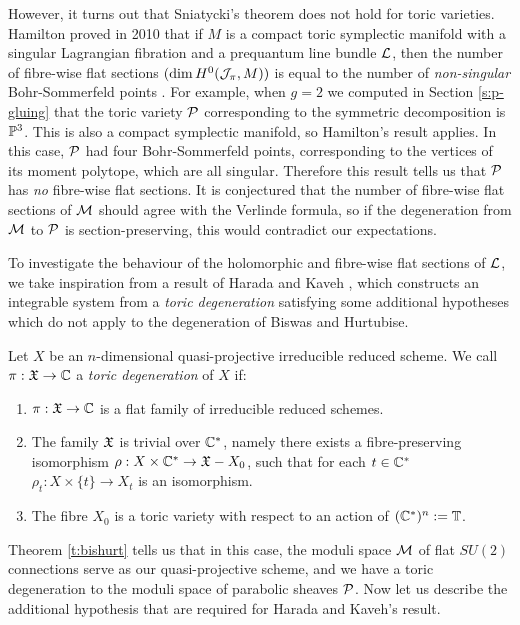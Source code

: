 	However, it turns out that Sniatycki's theorem does not hold for toric varieties. Hamilton proved in 2010 that if $M$ is a compact toric symplectic manifold with a singular Lagrangian fibration and a prequantum line bundle $\mathcal{L}$, then the number of fibre-wise flat sections $(\dim H^0(\mathcal{J}_{\pi}, M))$ is equal to the number of \emph{non-singular} Bohr-Sommerfeld points \cite[Theorem 8.3.2]{hamilton_locally_2010}. For example, when $g=2$ we computed in Section \ref{s:p-gluing} that the toric variety $\mathcal{P}$ corresponding to the symmetric decomposition is $\mathbb{P}^3$. This is also a compact symplectic manifold, so Hamilton's result applies. In this case, $\mathcal{P}$ had four Bohr-Sommerfeld points, corresponding to the vertices of its moment polytope, which are all singular. Therefore this result tells us that $\mathcal{P}$ has \emph{no} fibre-wise flat sections. It is conjectured that the number of fibre-wise flat sections of $\mathcal{M}$ should agree with the Verlinde formula, so if the degeneration from $\mathcal{M}$ to $\mathcal{P}$ is section-preserving, this would contradict our expectations.
	
	To investigate the behaviour of the holomorphic and fibre-wise flat sections of $\mathcal{L}$, we take inspiration from a result of Harada and Kaveh \cite{harada_integrable_2015}, which constructs an integrable system from a \textit{toric degeneration} satisfying some additional hypotheses which do not apply to the degeneration of Biswas and Hurtubise. 
	\begin{definition}
		\label{d:toricdegen}
		Let $X$ be an $n$-dimensional quasi-projective irreducible reduced scheme. We call $\pi: \mathfrak{X}\to\mathbb{C}$ a \emph{toric degeneration} of $X$ if:
		\begin{enumerate}
			\item $\pi:\mathfrak{X}\to\mathbb{C}$ is a flat family of irreducible reduced schemes.
			\item The family $\mathfrak{X}$ is trivial over $\mathbb{C}^\ast$, namely there exists a fibre-preserving isomorphism $\rho:X\times\mathbb{C}^\ast \to \mathfrak{X} - X_0$, such that for each $t\in \mathbb{C}^\ast$ $\rho_t:X\times\{t\} \to X_t$ is an isomorphism.
			\item The fibre $X_0$ is a toric variety with respect to an action of $(\mathbb{C}^\ast)^n := \mathbb{T}$.
		\end{enumerate}
	\end{definition}
	Theorem \ref{t:bishurt} tells us that in this case, the moduli space $\mathcal{M}$ of flat $SU(2)$ connections serve as our quasi-projective scheme, and we have a toric degeneration to the moduli space of parabolic sheaves $\mathcal{P}$. Now let us describe the additional hypothesis that are required for Harada and Kaveh's result.
	
